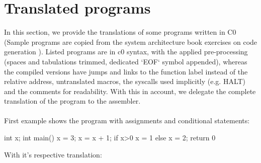 \section{Translated programs}\label{sec:translated_programs}
In this section, we provide the translations of some programs written in C0 (Sample programs are copied from the system architecture book exercises on code generation \cite{sysbook}).
Listed programs are in c0 syntax, with the applied pre-processing (spaces and tabulations trimmed, dedicated `EOF` symbol appended),
whereas the compiled versions have jumps and links to the function label instead of the relative address, untranslated macros, the syscalls
used implicitly (e.g. HALT) and the comments for readability. With this in account, we delegate the complete translation of the program to the assembler.\\~\\
First example shows the program with assignments and conditional statements:
\begin{codeblock}
int x;
int main(){
x = 3;
x = x + 1;
if x>0 {x = 1} else {x = 2};
return 0
}~
\end{codeblock}
With it's respective translation:

